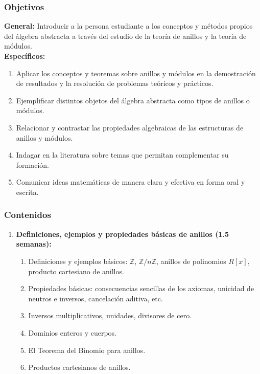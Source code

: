 \begin{refsection}
\subsubsection*{Objetivos}

\textbf{General:} Introducir a la persona estudiante a los conceptos y métodos propios del álgebra abstracta a través del estudio de la teoría de anillos y la teoría de módulos. \\

\textbf{Específicos:}

\begin{enumerate}
\item Aplicar los conceptos y teoremas sobre anillos y módulos en la demostración de resultados y la resolución de problemas teóricos y prácticos.
\item Ejemplificar distintos objetos del álgebra abstracta como tipos de anillos o módulos.
\item Relacionar y contrastar las propiedades algebraicas de las estructuras de anillos y módulos.
\item Indagar en la literatura sobre temas que permitan complementar su formación.
\item Comunicar ideas matemáticas de manera clara y efectiva en forma oral y escrita.
\end{enumerate}

\subsubsection*{Contenidos}

\begin{enumerate}
\item \textbf{Definiciones, ejemplos y propiedades básicas de anillos (1.5 semanas):} 
\begin{enumerate}
    \item Definiciones y ejemplos básicos: $\mathbb{Z}$, $\mathbb{Z}/n\mathbb{Z}$, anillos de polinomios $R[x]$, producto cartesiano de anillos.
    \item Propiedades básicas: consecuencias sencillas de los axiomas, unicidad de neutros e inversos, cancelación aditiva, etc.
    \item Inversos multiplicativos, unidades, divisores de cero.
    \item Dominios enteros y cuerpos.
    \item El Teorema del Binomio para anillos.
    \item Productos cartesianos de anillos.
\end{enumerate}


\end{enumerate}
\end{refsection}
